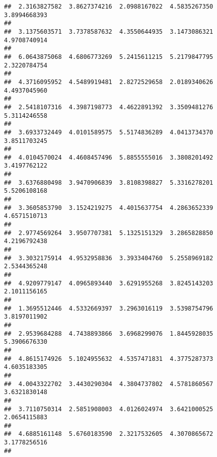 \documentclass[]{article}
\begin{document}
\begin{verbatim}
##  2.3163827582  3.8627374216  2.0988167022  4.5835267350  3.8994668393 
##                                                                       
##  3.1375603571  3.7378587632  4.3550644935  3.1473086321  4.9708740914 
##                                                                       
##  6.0643875068  4.6806773269  5.2415611215  5.2179847795  2.3220784754 
##                                                                       
##  4.3716095952  4.5489919481  2.8272529658  2.0189340626  4.4937045960 
##                                                                       
##  2.5418107316  4.3987198773  4.4622891392  3.3509481276  5.3114246558 
##                                                                       
##  3.6933732449  4.0101589575  5.5174836289  4.0413734370  3.8511703245 
##                                                                       
##  4.0104570024  4.4608457496  5.8855555016  3.3808201492  3.4197762122 
##                                                                       
##  3.6376880498  3.9470906839  3.8108398827  5.3316278201  5.5206108168 
##                                                                       
##  3.3605853790  3.1524219275  4.4015637754  4.2863652339  4.6571510713 
##                                                                       
##  2.9774569264  3.9507707381  5.1325151329  3.2865828850  4.2196792438 
##                                                                       
##  3.3032175914  4.9532958836  3.3933404760  5.2558969182  2.5344365248 
##                                                                       
##  4.9209779147  4.0965893440  3.6291955268  3.8245143203  2.1011156165 
##                                                                       
##  1.3695512446  4.5332669397  3.2963016119  3.5398754796  3.8197011902 
##                                                                       
##  2.9539684288  4.7438893866  3.6968299076  1.8445928035  5.3906676330 
##                                                                       
##  4.8615174926  5.1024955632  4.5357471831  4.3775287373  4.6035183305 
##                                                                       
##  4.0043322702  3.4430290304  4.3804737802  4.5781860567  3.6321830148 
##                                                                       
##  3.7110750314  2.5851908003  4.0126024974  3.6421000525  2.0654115883 
##                                                                       
##  4.6885161148  5.6760183590  2.3217532605  4.3070865672  3.1778256516 
##                                                                       

\end{verbatim}
\end{document}
